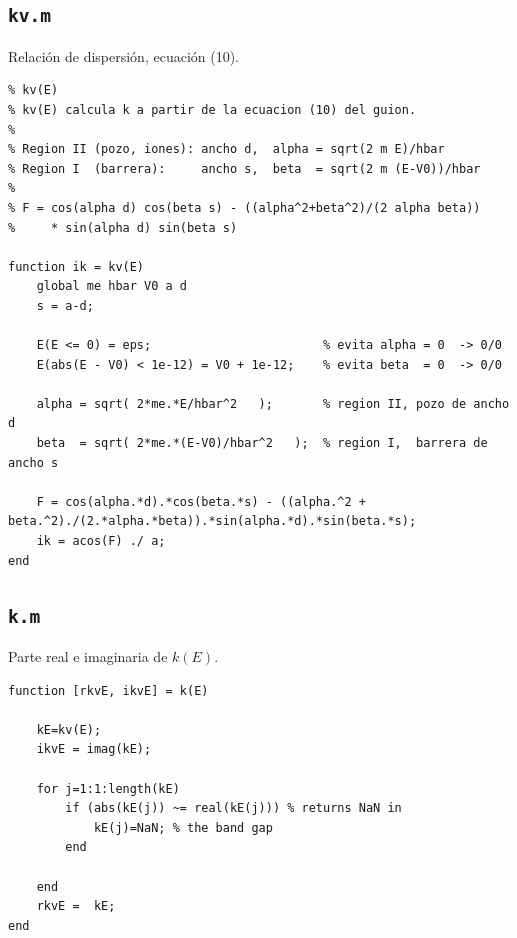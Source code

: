 \documentclass[hidelinks]{article}
\begin{document}
\subsection{\texttt{kv.m}}
Relación de dispersión, ecuación (10).
\begin{lstlisting}
% kv(E)
% kv(E) calcula k a partir de la ecuacion (10) del guion.
%
% Region II (pozo, iones): ancho d,  alpha = sqrt(2 m E)/hbar
% Region I  (barrera):     ancho s,  beta  = sqrt(2 m (E-V0))/hbar
%
% F = cos(alpha d) cos(beta s) - ((alpha^2+beta^2)/(2 alpha beta))
%     * sin(alpha d) sin(beta s)

function ik = kv(E)
    global me hbar V0 a d
    s = a-d;

    E(E <= 0) = eps;                        % evita alpha = 0  -> 0/0
    E(abs(E - V0) < 1e-12) = V0 + 1e-12;    % evita beta  = 0  -> 0/0

    alpha = sqrt( 2*me.*E/hbar^2   );       % region II, pozo de ancho d
    beta  = sqrt( 2*me.*(E-V0)/hbar^2   );  % region I,  barrera de ancho s

    F = cos(alpha.*d).*cos(beta.*s) - ((alpha.^2 + beta.^2)./(2.*alpha.*beta)).*sin(alpha.*d).*sin(beta.*s);
    ik = acos(F) ./ a;
end
\end{lstlisting}

\subsection{\texttt{k.m}}
Parte real e imaginaria de $k(E)$.
\begin{lstlisting}
function [rkvE, ikvE] = k(E)
    
    kE=kv(E); 
    ikvE = imag(kE);

    for j=1:1:length(kE) 
        if (abs(kE(j)) ~= real(kE(j))) % returns NaN in 
            kE(j)=NaN; % the band gap 
        end
        
    end
    rkvE =  kE;
end
\end{lstlisting}
\end{document}
